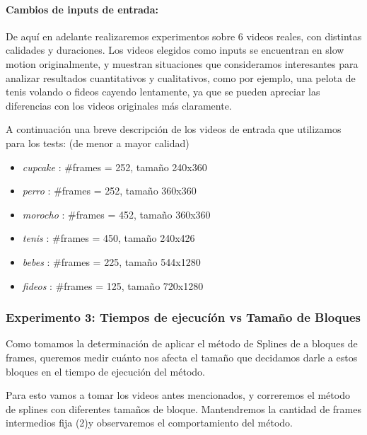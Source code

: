 \paragraph{Cambios de inputs de entrada:}
De aquí en adelante realizaremos experimentos sobre 6 videos reales, con distintas calidades y duraciones. Los videos elegidos como inputs se encuentran en slow motion originalmente, y muestran situaciones que consideramos interesantes para analizar resultados cuantitativos y cualitativos, como por ejemplo, una pelota de tenis volando o fideos cayendo lentamente, ya que se pueden apreciar las diferencias con los videos originales más claramente.
\par A continuación una breve descripción de los videos de entrada que utilizamos para los tests: (de menor a mayor calidad)
\begin{multicols}{2}
\begin{itemize}
\item \textit{cupcake} : $\#$frames = 252, tamaño 240x360
\item \textit{perro} : $\#$frames = 252, tamaño 360x360
\item \textit{morocho} : $\#$frames = 452, tamaño 360x360
\item \textit{tenis} : $\#$frames = 450, tamaño 240x426
\item \textit{bebes} : $\#$frames = 225, tamaño 544x1280
\item \textit{fideos} : $\#$frames = 125, tamaño 720x1280
\end{itemize}
\end{multicols}


\subsubsection{Experimento 3: Tiempos de ejecucí\'on vs Tama\~no de Bloques}
\par Como tomamos la determinación de aplicar el m\'etodo de Splines de a bloques de frames, queremos medir cu\'anto nos afecta el tama\~no que decidamos darle a estos bloques en el tiempo de ejecuci\'on del m\'etodo.
\par Para esto vamos a tomar los videos antes mencionados, y correremos el m\'etodo de splines con diferentes tama\~nos de bloque. Mantendremos la cantidad de frames intermedios fija (2)y observaremos el comportamiento del m\'etodo.

